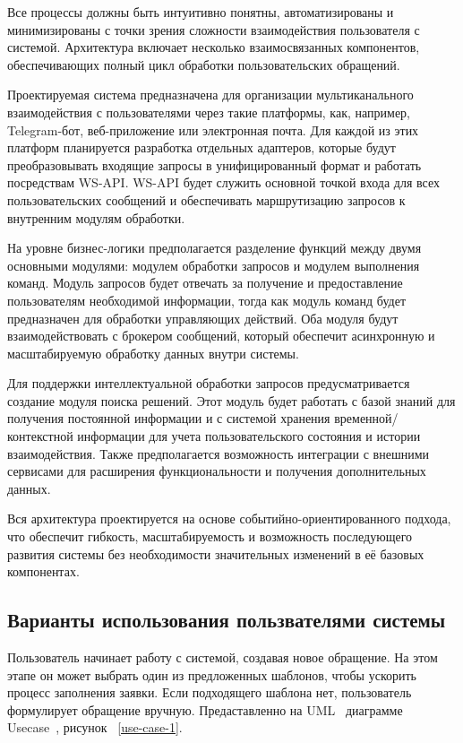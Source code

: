 Все процессы должны быть интуитивно понятны, автоматизированы и минимизированы с точки зрения сложности взаимодействия пользователя с системой. Архитектура включает несколько взаимосвязанных компонентов, обеспечивающих полный цикл обработки пользовательских обращений.

Проектируемая система предназначена для организации мультиканального взаимодействия с пользователями через такие платформы, как, например, Telegram-бот, веб-приложение или электронная почта. Для каждой из этих платформ планируется разработка отдельных адаптеров, которые будут преобразовывать входящие запросы в унифицированный формат и работать посредствам WS-API. WS-API будет служить основной точкой входа для всех пользовательских сообщений и обеспечивать маршрутизацию запросов к внутренним модулям обработки.

На уровне бизнес-логики предполагается разделение функций между двумя основными модулями: модулем обработки запросов и модулем выполнения команд. Модуль запросов будет отвечать за получение и предоставление пользователям необходимой информации, тогда как модуль команд будет предназначен для обработки управляющих действий. Оба модуля будут взаимодействовать с брокером сообщений, который обеспечит асинхронную и масштабируемую обработку данных внутри системы.

Для поддержки интеллектуальной обработки запросов предусматривается создание модуля поиска решений. Этот модуль будет работать с базой знаний для получения постоянной информации и с системой хранения временной/контекстной информации для учета пользовательского состояния и истории взаимодействия. Также предполагается возможность интеграции с внешними сервисами для расширения функциональности и получения дополнительных данных.

Вся архитектура проектируется на основе событийно-ориентированного подхода, что обеспечит гибкость, масштабируемость и возможность последующего развития системы без необходимости значительных изменений в её базовых компонентах.


\subsection{Варианты использования пользвателями системы}

Пользователь начинает работу с системой, создавая новое обращение. На этом этапе он может выбрать один из предложенных шаблонов, чтобы ускорить процесс заполнения заявки. Если подходящего шаблона нет, пользователь формулирует обращение вручную. Предаставленно на UML~\cite{Uml} диаграмме Usecase~\cite{Usecase}, рисунок ~\ref{use-case-1}.

